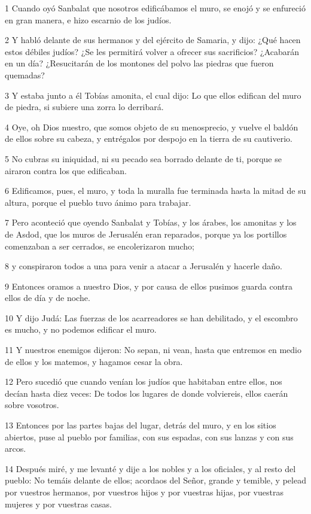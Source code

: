 \par 1 Cuando oyó Sanbalat que nosotros edificábamos el muro, se enojó y se enfureció en gran manera, e hizo escarnio de los judíos.
\par 2 Y habló delante de sus hermanos y del ejército de Samaria, y dijo: ¿Qué hacen estos débiles judíos? ¿Se les permitirá volver a ofrecer sus sacrificios? ¿Acabarán en un día? ¿Resucitarán de los montones del polvo las piedras que fueron quemadas?
\par 3 Y estaba junto a él Tobías amonita, el cual dijo: Lo que ellos edifican del muro de piedra, si subiere una zorra lo derribará.
\par 4 Oye, oh Dios nuestro, que somos objeto de su menosprecio, y vuelve el baldón de ellos sobre su cabeza, y entrégalos por despojo en la tierra de su cautiverio.
\par 5 No cubras su iniquidad, ni su pecado sea borrado delante de ti, porque se airaron contra los que edificaban.
\par 6 Edificamos, pues, el muro, y toda la muralla fue terminada hasta la mitad de su altura, porque el pueblo tuvo ánimo para trabajar.
\par 7 Pero aconteció que oyendo Sanbalat y Tobías, y los árabes, los amonitas y los de Asdod, que los muros de Jerusalén eran reparados, porque ya los portillos comenzaban a ser cerrados, se encolerizaron mucho;
\par 8 y conspiraron todos a una para venir a atacar a Jerusalén y hacerle daño.
\par 9 Entonces oramos a nuestro Dios, y por causa de ellos pusimos guarda contra ellos de día y de noche.
\par 10 Y dijo Judá: Las fuerzas de los acarreadores se han debilitado, y el escombro es mucho, y no podemos edificar el muro.
\par 11 Y nuestros enemigos dijeron: No sepan, ni vean, hasta que entremos en medio de ellos y los matemos, y hagamos cesar la obra.
\par 12 Pero sucedió que cuando venían los judíos que habitaban entre ellos, nos decían hasta diez veces: De todos los lugares de donde volviereis, ellos caerán sobre vosotros.
\par 13 Entonces por las partes bajas del lugar, detrás del muro, y en los sitios abiertos, puse al pueblo por familias, con sus espadas, con sus lanzas y con sus arcos.
\par 14 Después miré, y me levanté y dije a los nobles y a los oficiales, y al resto del pueblo: No temáis delante de ellos; acordaos del Señor, grande y temible, y pelead por vuestros hermanos, por vuestros hijos y por vuestras hijas, por vuestras mujeres y por vuestras casas.
